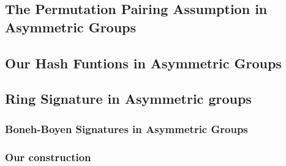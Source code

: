 \documentclass{llncs}
\begin{document}
	\subsection{The Permutation Pairing Assumption in Asymmetric Groups} \label{sec:aPPA}
	
		

	\subsection{Our Hash Funtions in Asymmetric Groups}
		
		

	\subsection{Ring Signature in Asymmetric groups}

		\subsubsection{Boneh-Boyen Signatures in Asymmetric Groups}

		

		\subsubsection{Our construction}

		
\end{document}
